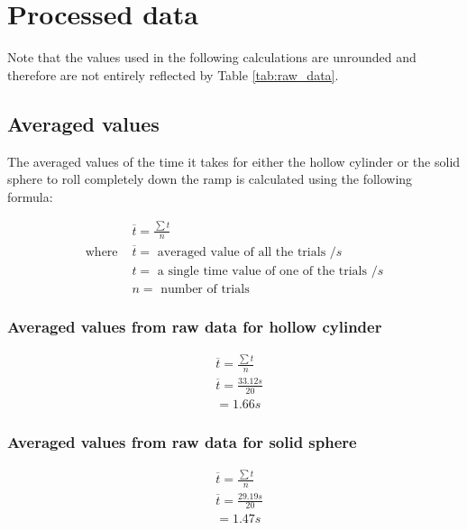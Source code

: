 \documentclass[letterpaper, 12pt]{article}
\begin{document}
\section{Processed data}

Note that the values used in the following calculations are unrounded and therefore are not entirely
reflected by Table \ref*{tab:raw_data}.

\subsection{Averaged values}

The averaged values of the time it takes for either the hollow cylinder or
the solid sphere to roll completely down the ramp is calculated using the following
formula:

\begin{align*}
                  & \overline{t} = \frac{\sum t}{n}
    \\
    \text{where } & \overline{t} = \text{ averaged value of all the trials } /\unit{s}
    \\
                  & t = \text{ a single time value of one of the trials } /\unit{s}
    \\
                  & n = \text{ number of trials }
\end{align*}

\subsubsection{Averaged values from raw data for hollow cylinder}

\begin{align*}
     & \overline{t} = \frac{\sum t}{n}
    \\
     & \overline{t} = \frac{33.12 \unit{s}}{20}
    \\
     & = 1.66 \unit{s}
\end{align*}

\subsubsection{Averaged values from raw data for solid sphere}

\begin{align*}
     & \overline{t} = \frac{\sum t}{n}
    \\
     & \overline{t} = \frac{29.19\unit{s}}{20}
    \\
     & = 1.47\unit{s}
\end{align*}
\end{document}
